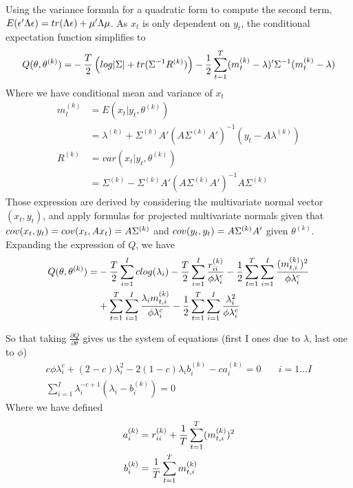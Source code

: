 \documentclass[twoside]{article}
\begin{document}
Using the variance formula for a quadratic form to compute the second term, $E(\epsilon' \Lambda \epsilon) = tr(\Lambda \epsilon) + \mu' \* \Lambda \mu$. As $x_t$ is only dependent on $y_t$, the conditional expectation function simplifies to
\begin{align*}
Q(\theta, \theta^{(k)}) = & - \frac{T}{2} \* \left(log|\Sigma| + tr(\Sigma^{-1} \* R^{(k)}) \right) - \frac{1}{2} \* \sum_{t=1}^{T} (m_t^{(k)} - \lambda)' \* \Sigma^{-1} \* (m_t^{(k)} - \lambda) \\
\end{align*}
Where we have conditional mean and variance of $x_t$
\begin{align*}
m_t^{(k)} & = E\left(x_t | y_t, \theta^{(k)}\right)\\
& = \lambda^{(k)} + \Sigma^{(k)} A' (A \Sigma^{(k)} A' )^{-1} \left(y_t - A \lambda^{(k)}\right)\\
R^{(k)} & = var\left(x_t | y_t, \theta^{(k)}\right)\\
& = \Sigma^{(k)} - \Sigma^{(k)} A' (A \Sigma^{(k)} A' )^{-1} A \Sigma^{(k)}
\end{align*}
Those expression are derived by considering the multivariate normal vector $(x_t, y_t)$, and apply formulas for projected multivariate normals given that $cov(x_t, y_t) = cov(x_t, A x_t) = A \* \Sigma^{(k)}$ and $cov(y_t, y_t) = A \* \Sigma^{(k)} \* A'$ given $\theta^{(k)}$.\\

Expanding the expression of $Q$, we have
\begin{align*}
Q(\theta, \theta^{(k)}) = & - \frac{T}{2} \sum_{i = 1}^I c \* log(\lambda_i) - \frac{T}{2} \sum_{i = 1}^{I} \frac{r_{i i}^{(k)}}{\phi \* \lambda_i^{c}} - \frac{1}{2} \* \sum_{t=1}^{T} \sum_{i=1}^I \frac{(m_{t, i}^{(k)})^2}{\phi \* \lambda_i^c}\\
& + \sum_{t=1}^T \sum_{i=1}^I \frac{\lambda_i \* m_{t, i}^{(k)}}{\phi \* \lambda_i^c} - \frac{1}{2} \* \sum_{t=1}^T \sum_{i=1}^I \frac{\lambda_i^2}{\phi \* \lambda_i^c}
\end{align*}

So that taking $\frac{\partial Q}{\partial \theta}$ gives us the system of equations (first I ones due to $\lambda$, last one to $\phi$)
\begin{eqnarray}
c \phi \lambda_i^{c} + (2 - c) \lambda_i^2 - 2 ( 1 -c) \lambda_i b_i^{(k)} - c a_i^{(k)} = 0 &  \quad i = 1...I \\
\sum_{i = 1}^I \lambda_i^{-c + 1} ( \lambda_i - b_i^{(k)} )  = 0 &
\end{eqnarray}
Where we have defined
\begin{align*}
a_i^{(k)} & = r_{i i}^{(k)} + \frac{1}{T} \* \sum_{t=1}^T (m_{t, i}^{(k)})^2\\
b_i^{(k)} & = \frac{1}{T} \* \sum_{t=1}^T m_{t, i}^{(k)}
\end{align*}
\end{document}

